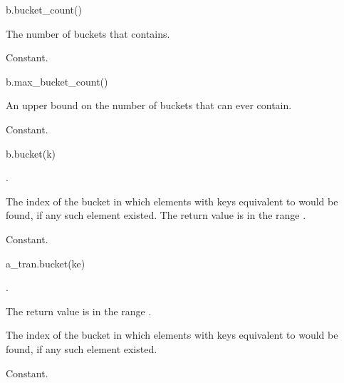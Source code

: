 %
\begin{itemdecl}
b.bucket_count()
\end{itemdecl}

\begin{itemdescr}
\pnum
\result
{}

\pnum
\returns
The number of buckets that  contains.

\pnum
\complexity
Constant.
\end{itemdescr}

%
\begin{itemdecl}
b.max_bucket_count()
\end{itemdecl}

\begin{itemdescr}
\pnum
\result
{}

\pnum
\returns
An upper bound on the number of buckets that  can ever contain.

\pnum
\complexity
Constant.
\end{itemdescr}

%
\begin{itemdecl}
b.bucket(k)
\end{itemdecl}

\begin{itemdescr}
\pnum
\result
{}

\pnum
\expects
{}.

\pnum
\returns
The index of the bucket
in which elements with keys equivalent to  would be found,
if any such element existed.
The return value is in the range \tcode{[0, b.bucket_count())}.

\pnum
\complexity
Constant.
\end{itemdescr}

%
\begin{itemdecl}
a_tran.bucket(ke)
\end{itemdecl}

\begin{itemdescr}
\pnum
\result
{}

\pnum
\expects
{}.

\pnum
\ensures
The return value is in the range \tcode{[0, a_tran.bucket_count())}.

\pnum
\returns
The index of the bucket
in which elements with keys equivalent to  would be found,
if any such element existed.

\pnum
\complexity
Constant.
\end{itemdescr}

